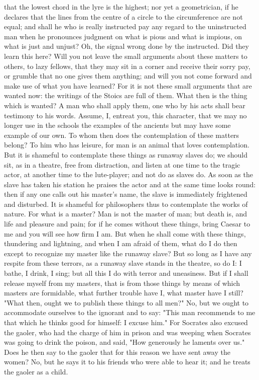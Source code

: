 \documentclass[a4paper]{article}
\begin{document}
that the lowest chord in the lyre is the highest; nor yet a geometrician, if he
declares that the lines from the centre of a circle to the circumference are
not equal; and shall he who is really instructed pay any regard to the
uninstructed man when he pronounces judgment on what is pious and what is
impious, on what is just and unjust? Oh, the signal wrong done by the
instructed. Did they learn this here?
    Will you not leave the small arguments about these matters to others, to
lazy fellows, that they may sit in a corner and receive their sorry pay, or
grumble that no one gives them anything; and will you not come forward and make
use of what you have learned? For it is not these small arguments that are
wanted now: the writings of the Stoics are full of them. What then is the thing
which is wanted? A man who shall apply them, one who by his acts shall bear
testimony to his words. Assume, I, entreat you, this character, that we may no
longer use in the schools the examples of the ancients but may have some
example of our own.
    To whom then does the contemplation of these matters belong? To him who has
leisure, for man is an animal that loves contemplation. But it is shameful to
contemplate these things as runaway slaves do; we should sit, as in a theatre,
free from distraction, and listen at one time to the tragic actor, at another
time to the lute-player; and not do as slaves do. As soon as the slave has
taken his station he praises the actor and at the same time looks round: then
if any one calls out his master's name, the slave is immediately frightened and
disturbed. It is shameful for philosophers thus to contemplate the works of
nature. For what is a master? Man is not the master of man; but death is, and
life and pleasure and pain; for if he comes without these things, bring Caesar
to me and you will see how firm I am. But when he shall come with these things,
thundering and lightning, and when I am afraid of them, what do I do then
except to recognize my master like the runaway slave? But so long as I have any
respite from these terrors, as a runaway slave stands in the theatre, so do I:
I bathe, I drink, I sing; but all this I do with terror and uneasiness. But if
I shall release myself from my masters, that is from those things by means of
which masters are formidable, what further trouble have I, what master have I
still?
    "What then, ought we to publish these things to all men?" No, but we ought
to accommodate ourselves to the ignorant and to say: "This man recommends to me
that which he thinks good for himself: I excuse him." For Socrates also excused
the gaoler, who had the charge of him in prison and was weeping when Socrates
was going to drink the poison, and said, "How generously he laments over us."
Does he then say to the gaoler that for this reason we have sent away the
women? No, but he says it to his friends who were able to hear it; and he
treats the gaoler as a child.
\end{document}
